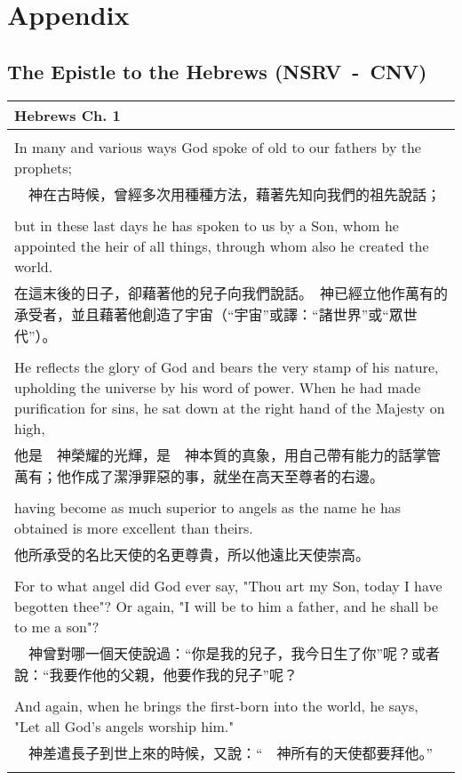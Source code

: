 \documentclass{book}
\begin{document}
\chapter*{Appendix}
\section*{The Epistle to the Hebrews (NSRV~-~CNV)}
\small
\begin{tabularx}{\textwidth}{p{}}
\hline
Hebrews Ch. 1 \\
\hline \\
In many and various ways God spoke of old to our fathers by the prophets; \\
 　神在古時候，曾經多次用種種方法，藉著先知向我們的祖先說話； \\ \\
but in these last days he has spoken to us by a Son, whom he appointed the heir of all things, through whom also he created the world. \\
 在這末後的日子，卻藉著他的兒子向我們說話。　神已經立他作萬有的承受者，並且藉著他創造了宇宙（“宇宙”或譯：“諸世界”或“眾世代”）。 \\ \\
He reflects the glory of God and bears the very stamp of his nature, upholding the universe by his word of power. When he had made purification for sins, he sat down at the right hand of the Majesty on high, \\
 他是　神榮耀的光輝，是　神本質的真象，用自己帶有能力的話掌管萬有；他作成了潔淨罪惡的事，就坐在高天至尊者的右邊。 \\ \\
having become as much superior to angels as the name he has obtained is more excellent than theirs. \\
 他所承受的名比天使的名更尊貴，所以他遠比天使崇高。 \\ \\
For to what angel did God ever say, "Thou art my Son, today I have begotten thee"? Or again, "I will be to him a father, and he shall be to me a son"? \\
 　神曾對哪一個天使說過：“你是我的兒子，我今日生了你”呢？或者說：“我要作他的父親，他要作我的兒子”呢？ \\ \\
And again, when he brings the first-born into the world, he says, "Let all God's angels worship him." \\
 　神差遣長子到世上來的時候，又說：“　神所有的天使都要拜他。” \\ \\

\end{tabularx}
\end{document}
